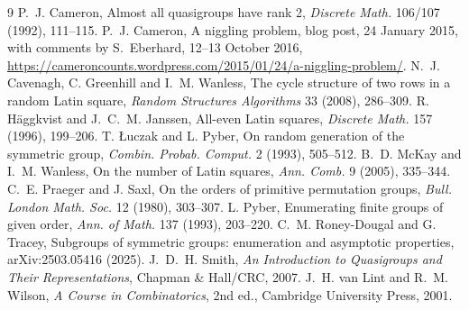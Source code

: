 \documentclass[11pt]{amsart}
\theoremstyle{plain}
\theoremstyle{remark}
\begin{document}
\begin{thebibliography}{9}
 P.~J. Cameron, Almost all quasigroups have rank 2, \emph{Discrete Math.} 106/107 (1992), 111--115.
 P.~J. Cameron, A niggling problem, blog post, 24 January 2015, with comments by S.~Eberhard, 12--13 October 2016, \url{https://cameroncounts.wordpress.com/2015/01/24/a-niggling-problem/}.
 N.~J. Cavenagh, C. Greenhill and I.~M. Wanless, The cycle structure of two rows in a random Latin square, \emph{Random Structures Algorithms} 33 (2008), 286--309.
 R. H\"aggkvist and J.~C.~M. Janssen, All-even Latin squares, \emph{Discrete Math.} 157 (1996), 199--206.
 T. {\L}uczak and L. Pyber, On random generation of the symmetric group, \emph{Combin. Probab. Comput.} 2 (1993), 505--512.
 B.~D. McKay and I.~M. Wanless, On the number of Latin squares, \emph{Ann. Comb.} 9 (2005), 335--344.
 C.~E. Praeger and J. Saxl, On the orders of primitive permutation groups, \emph{Bull. London Math. Soc.} 12 (1980), 303--307.
 L. Pyber, Enumerating finite groups of given order, \emph{Ann. of Math.} 137 (1993), 203--220.
 C.~M. Roney-Dougal and G. Tracey, Subgroups of symmetric groups: enumeration and asymptotic properties, arXiv:2503.05416 (2025).
 J.~D.~H. Smith, \emph{An Introduction to Quasigroups and Their Representations}, Chapman \& Hall/CRC, 2007.
 J.~H. van Lint and R.~M. Wilson, \emph{A Course in Combinatorics}, 2nd ed., Cambridge University Press, 2001.
\end{thebibliography}
\end{document}
